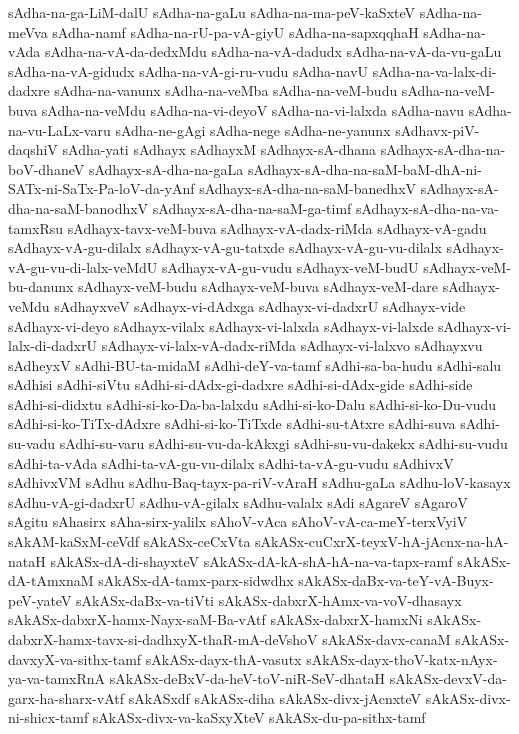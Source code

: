 {sAdha-na-ga-LiM-dalU
sAdha-na-gaLu
sAdha-na-ma-peV-kaSxteV
sAdha-na-meVva
sAdha-namf
sAdha-na-rU-pa-vA-giyU
sAdha-na-sapxqqhaH
sAdha-na-vAda
sAdha-na-vA-da-dedxMdu
sAdha-na-vA-dadudx
sAdha-na-vA-da-vu-gaLu
sAdha-na-vA-gidudx
sAdha-na-vA-gi-ru-vudu
sAdha-navU
sAdha-na-va-lalx-di-dadxre
sAdha-na-vanunx
sAdha-na-veMba
sAdha-na-veM-budu
sAdha-na-veM-buva
sAdha-na-veMdu
sAdha-na-vi-deyoV
sAdha-na-vi-lalxda
sAdha-navu
sAdha-na-vu-LaLx-varu
sAdha-ne-gAgi
sAdha-nege
sAdha-ne-yanunx
sAdhavx-piV-daqshiV
sAdha-yati
sAdhayx
sAdhayxM
sAdhayx-sA-dhana
sAdhayx-sA-dha-na-boV-dhaneV
sAdhayx-sA-dha-na-gaLa
sAdhayx-sA-dha-na-saM-baM-dhA-ni-SATx-ni-SaTx-Pa-loV-da-yAnf
sAdhayx-sA-dha-na-saM-banedhxV
sAdhayx-sA-dha-na-saM-banodhxV
sAdhayx-sA-dha-na-saM-ga-timf
sAdhayx-sA-dha-na-va-tamxRsu
sAdhayx-tavx-veM-buva
sAdhayx-vA-dadx-riMda
sAdhayx-vA-gadu
sAdhayx-vA-gu-dilalx
sAdhayx-vA-gu-tatxde
sAdhayx-vA-gu-vu-dilalx
sAdhayx-vA-gu-vu-di-lalx-veMdU
sAdhayx-vA-gu-vudu
sAdhayx-veM-budU
sAdhayx-veM-bu-danunx
sAdhayx-veM-budu
sAdhayx-veM-buva
sAdhayx-veM-dare
sAdhayx-veMdu
sAdhayxveV
sAdhayx-vi-dAdxga
sAdhayx-vi-dadxrU
sAdhayx-vide
sAdhayx-vi-deyo
sAdhayx-vilalx
sAdhayx-vi-lalxda
sAdhayx-vi-lalxde
sAdhayx-vi-lalx-di-dadxrU
sAdhayx-vi-lalx-vA-dadx-riMda
sAdhayx-vi-lalxvo
sAdhayxvu
sAdheyxV
sAdhi-BU-ta-midaM
sAdhi-deY-va-tamf
sAdhi-sa-ba-hudu
sAdhi-salu
sAdhisi
sAdhi-siVtu
sAdhi-si-dAdx-gi-dadxre
sAdhi-si-dAdx-gide
sAdhi-side
sAdhi-si-didxtu
sAdhi-si-ko-Da-ba-lalxdu
sAdhi-si-ko-Dalu
sAdhi-si-ko-Du-vudu
sAdhi-si-ko-TiTx-dAdxre
sAdhi-si-ko-TiTxde
sAdhi-su-tAtxre
sAdhi-suva
sAdhi-su-vadu
sAdhi-su-varu
sAdhi-su-vu-da-kAkxgi
sAdhi-su-vu-dakekx
sAdhi-su-vudu
sAdhi-ta-vAda
sAdhi-ta-vA-gu-vu-dilalx
sAdhi-ta-vA-gu-vudu
sAdhivxV
sAdhivxVM
sAdhu
sAdhu-Baq-tayx-pa-riV-vAraH
sAdhu-gaLa
sAdhu-loV-kasayx
sAdhu-vA-gi-dadxrU
sAdhu-vA-gilalx
sAdhu-valalx
sAdi
sAgareV
sAgaroV
sAgitu
sAhasirx
sAha-sirx-yalilx
sAhoV-vAca
sAhoV-vA-ca-meY-terxVyiV
sAkAM-kaSxM-ceVdf
sAkASx-ceCxVta
sAkASx-cuCxrX-teyxV-hA-jAcnx-na-hA-nataH
sAkASx-dA-di-shayxteV
sAkASx-dA-kA-shA-hA-na-va-tapx-ramf
sAkASx-dA-tAmxnaM
sAkASx-dA-tamx-parx-sidwdhx
sAkASx-daBx-va-teY-vA-Buyx-peV-yateV
sAkASx-daBx-va-tiVti
sAkASx-dabxrX-hAmx-va-voV-dhasayx
sAkASx-dabxrX-hamx-Nayx-saM-Ba-vAtf
sAkASx-dabxrX-hamxNi
sAkASx-dabxrX-hamx-tavx-si-dadhxyX-thaR-mA-deVshoV
sAkASx-davx-canaM
sAkASx-davxyX-va-sithx-tamf
sAkASx-dayx-thA-vasutx
sAkASx-dayx-thoV-katx-nAyx-ya-va-tamxRnA
sAkASx-deBxV-da-heV-toV-niR-SeV-dhataH
sAkASx-devxV-da-garx-ha-sharx-vAtf
sAkASxdf
sAkASx-diha
sAkASx-divx-jAcnxteV
sAkASx-divx-ni-shicx-tamf
sAkASx-divx-va-kaSxyXteV
sAkASx-du-pa-sithx-tamf
}
